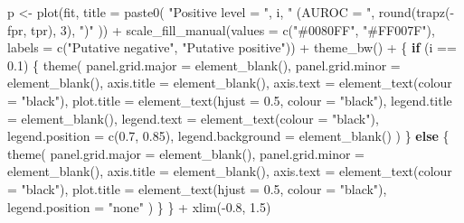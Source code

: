 \documentclass[
  11pt,
  oneside]{book}
\newenvironment{Shaded}{\begin{snugshade}}{\end{snugshade}}
\newcommand{\AttributeTok}[1]{\textcolor[rgb]{0.77,0.63,0.00}{#1}}
\newcommand{\ControlFlowTok}[1]{\textcolor[rgb]{0.13,0.29,0.53}{\textbf{#1}}}
\newcommand{\DecValTok}[1]{\textcolor[rgb]{0.00,0.00,0.81}{#1}}
\newcommand{\FloatTok}[1]{\textcolor[rgb]{0.00,0.00,0.81}{#1}}
\newcommand{\FunctionTok}[1]{\textcolor[rgb]{0.00,0.00,0.00}{#1}}
\newcommand{\NormalTok}[1]{#1}
\newcommand{\OtherTok}[1]{\textcolor[rgb]{0.56,0.35,0.01}{#1}}
\newcommand{\SpecialCharTok}[1]{\textcolor[rgb]{0.00,0.00,0.00}{#1}}
\newcommand{\StringTok}[1]{\textcolor[rgb]{0.31,0.60,0.02}{#1}}
\begin{document}
\begin{Shaded}
\begin{Highlighting}[]
\NormalTok{  p }\OtherTok{\textless{}{-}} \FunctionTok{plot}\NormalTok{(fit, }\AttributeTok{title =} \FunctionTok{paste0}\NormalTok{(}
    \StringTok{"Positive level = "}\NormalTok{, i,}
    \StringTok{" (AUROC = "}\NormalTok{, }\FunctionTok{round}\NormalTok{(}\FunctionTok{trapz}\NormalTok{(}\SpecialCharTok{{-}}\NormalTok{fpr, tpr), }\DecValTok{3}\NormalTok{), }\StringTok{")"}
\NormalTok{  )) }\SpecialCharTok{+}
    \FunctionTok{scale\_fill\_manual}\NormalTok{(}\AttributeTok{values =} \FunctionTok{c}\NormalTok{(}\StringTok{"\#0080FF"}\NormalTok{, }\StringTok{"\#FF007F"}\NormalTok{), }\AttributeTok{labels =} \FunctionTok{c}\NormalTok{(}\StringTok{"Putative negative"}\NormalTok{, }\StringTok{"Putative positive"}\NormalTok{)) }\SpecialCharTok{+}
    \FunctionTok{theme\_bw}\NormalTok{() }\SpecialCharTok{+}
\NormalTok{    \{}
      \ControlFlowTok{if}\NormalTok{ (i }\SpecialCharTok{==} \FloatTok{0.1}\NormalTok{) \{}
        \FunctionTok{theme}\NormalTok{(}
          \AttributeTok{panel.grid.major =} \FunctionTok{element\_blank}\NormalTok{(),}
          \AttributeTok{panel.grid.minor =} \FunctionTok{element\_blank}\NormalTok{(),}
          \AttributeTok{axis.title =} \FunctionTok{element\_blank}\NormalTok{(),}
          \AttributeTok{axis.text =} \FunctionTok{element\_text}\NormalTok{(}\AttributeTok{colour =} \StringTok{"black"}\NormalTok{),}
          \AttributeTok{plot.title =} \FunctionTok{element\_text}\NormalTok{(}\AttributeTok{hjust =} \FloatTok{0.5}\NormalTok{, }\AttributeTok{colour =} \StringTok{"black"}\NormalTok{),}
          \AttributeTok{legend.title =} \FunctionTok{element\_blank}\NormalTok{(),}
          \AttributeTok{legend.text =} \FunctionTok{element\_text}\NormalTok{(}\AttributeTok{colour =} \StringTok{"black"}\NormalTok{),}
          \AttributeTok{legend.position =} \FunctionTok{c}\NormalTok{(}\FloatTok{0.7}\NormalTok{, }\FloatTok{0.85}\NormalTok{),}
          \AttributeTok{legend.background =} \FunctionTok{element\_blank}\NormalTok{()}
\NormalTok{        )}
\NormalTok{      \} }\ControlFlowTok{else}\NormalTok{ \{}
        \FunctionTok{theme}\NormalTok{(}
          \AttributeTok{panel.grid.major =} \FunctionTok{element\_blank}\NormalTok{(),}
          \AttributeTok{panel.grid.minor =} \FunctionTok{element\_blank}\NormalTok{(),}
          \AttributeTok{axis.title =} \FunctionTok{element\_blank}\NormalTok{(),}
          \AttributeTok{axis.text =} \FunctionTok{element\_text}\NormalTok{(}\AttributeTok{colour =} \StringTok{"black"}\NormalTok{),}
          \AttributeTok{plot.title =} \FunctionTok{element\_text}\NormalTok{(}\AttributeTok{hjust =} \FloatTok{0.5}\NormalTok{, }\AttributeTok{colour =} \StringTok{"black"}\NormalTok{),}
          \AttributeTok{legend.position =} \StringTok{"none"}
\NormalTok{        )}
\NormalTok{      \}}
\NormalTok{    \} }\SpecialCharTok{+}
    \FunctionTok{xlim}\NormalTok{(}\SpecialCharTok{{-}}\FloatTok{0.8}\NormalTok{, }\FloatTok{1.5}\NormalTok{)}


\end{Highlighting}
\end{Shaded}
\end{document}
